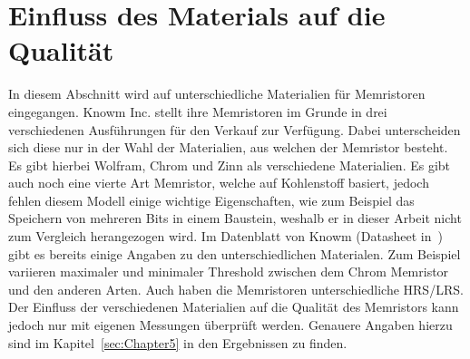 \section{Einfluss des Materials auf die Qualität}

In diesem Abschnitt wird auf unterschiedliche Materialien für Memristoren eingegangen. Knowm Inc. stellt ihre Memristoren im Grunde in drei verschiedenen Ausführungen für den Verkauf zur Verfügung. Dabei unterscheiden sich diese nur in der Wahl der Materialien, aus welchen der Memristor besteht. Es gibt hierbei Wolfram, Chrom und Zinn als verschiedene Materialien. Es gibt auch noch eine vierte Art Memristor, welche auf Kohlenstoff basiert, jedoch fehlen diesem Modell einige wichtige Eigenschaften, wie zum Beispiel das Speichern von mehreren Bits in einem Baustein, weshalb er in dieser Arbeit nicht zum Vergleich herangezogen wird. Im Datenblatt von Knowm (Datasheet in~\cite{knowm_comp_2019})
gibt es bereits einige Angaben zu den unterschiedlichen Materialen. Zum Beispiel variieren maximaler und minimaler Threshold zwischen dem Chrom Memristor und den anderen Arten. Auch haben die Memristoren unterschiedliche HRS/LRS. Der Einfluss der verschiedenen Materialien auf die Qualität des Memristors kann jedoch nur mit eigenen Messungen überprüft werden. Genauere Angaben hierzu sind im Kapitel~\ref{sec:Chapter5} in den Ergebnissen zu finden.
